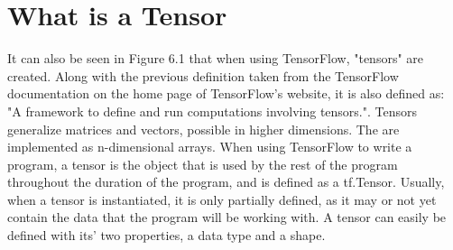 \documentclass[12pt]{report} %
\begin{document}
\section{What is a Tensor}
	It can also be seen in Figure 6.1 that when using TensorFlow, "tensors" are created. Along with the previous definition taken from the TensorFlow documentation on the home page of TensorFlow's website, it is also defined as: "A framework to define and run computations involving tensors."\cite{tensorFlow}. Tensors generalize matrices and vectors, possible in higher dimensions. The are implemented as n-dimensional arrays. When using TensorFlow to write a program, a tensor is the object that is used by the rest of the program throughout the duration of the program, and is defined as a tf.Tensor. Usually, when a tensor is instantiated, it is only partially defined, as it may or not yet contain the data that the program will be working with. A tensor can easily be defined with its' two properties, a data type and a shape\cite{tensorFlow}.
	
\end{document}

